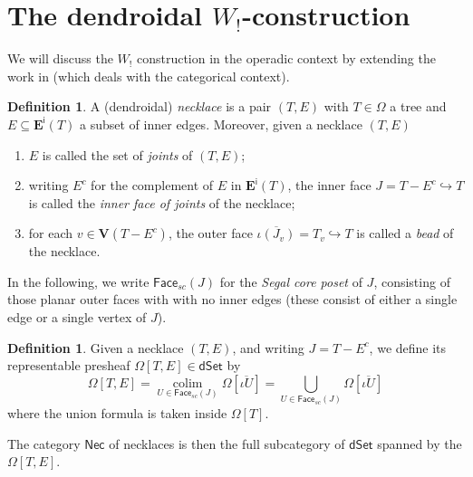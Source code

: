 \documentclass[a4paper,10pt
,draft
]{article}%
\numberwithin{equation}{section}
\numberwithin{figure}{section}
\theoremstyle{definition} %
\newtheorem{definition}[equation]{Definition}%
\DeclareMathOperator{\colim}{colim}%
\newcommand{\1}{\ensuremath{\mathbbm 1}}%
\begin{document}
\newpage
\appendix





\section{The dendroidal $W_!$-construction}


We will discuss the $W_!$
construction in the operadic context by extending the 
work in \cite{DS11}
(which deals with the categorical context).


\begin{definition}
A (dendroidal) \emph{necklace} is a pair $(T,E)$
with $T \in \Omega$
a tree and
$E \subseteq \boldsymbol{E}^{\mathsf{i}}(T)$
a subset of inner edges.
%
Moreover, given a necklace $(T,E)$
\begin{enumerate}[label = (\roman*)]
\item $E$ is called the set of \emph{joints} of $(T,E)$;
\item writing $E^c$ for the complement of $E$ in 
$\boldsymbol{E}^{\mathsf{i}}(T)$,
the inner face $J=T-E^c \hookrightarrow T$
is called the \emph{inner face of joints} of the necklace;
\item for each $v \in \boldsymbol{V}(T-E^c)$,
the outer face
$\overline{\iota(J_v)} = T_v \hookrightarrow T$
is called a \emph{bead} of the necklace.
\end{enumerate}
\end{definition}

In the following, we write 
$\mathsf{Face}_{sc}(J)$ for the \emph{Segal core poset} of $J$,
consisting of those planar outer faces with with no inner edges
(these consist of either a single edge or a single vertex of $J$).

\begin{definition}
	Given a necklace 
	$(T,E)$, 
	and writing $J = T-E^c$,
	we define its representable presheaf
	$\Omega[T,E] \in \mathsf{dSet}$ by
\begin{equation}
	\Omega[T,E] 
= 
	\underset{U \in \mathsf{Face}_{sc}(J)}{\colim}
	\Omega[\overline{\iota U}]
=
	\bigcup_{U \in \mathsf{Face}_{sc}(J)} 
	\Omega[\overline{\iota U}]
\end{equation}
	where the union formula is taken inside $\Omega[T]$.
	
	The category $\mathsf{Nec}$ of necklaces is then the full subcategory of $\mathsf{dSet}$
	spanned by the $\Omega[T,E]$.
\end{definition}
\end{document}
